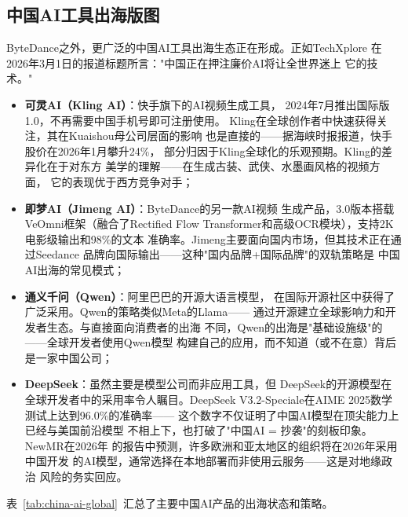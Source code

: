 \subsection{中国AI工具出海版图}
\label{subsec:outlook-china-tools-global}

ByteDance之外，更广泛的中国AI工具出海生态正在形成。正如TechXplore
在2026年3月1日的报道标题所言："中国正在押注廉价AI将让全世界迷上
它的技术。"

\begin{itemize}
  \item \textbf{可灵AI（Kling AI）}：快手旗下的AI视频生成工具，
    2024年7月推出国际版1.0，不再需要中国手机号即可注册使用。
    Kling在全球创作者中快速获得关注，其在Kuaishou母公司层面的影响
    也是直接的——据海峡时报报道，快手股价在2026年1月攀升24\%，
    部分归因于Kling全球化的乐观预期。Kling的差异化在于对东方
    美学的理解——在生成古装、武侠、水墨画风格的视频方面，
    它的表现优于西方竞争对手；

  \item \textbf{即梦AI（Jimeng AI）}：ByteDance的另一款AI视频
    生成产品，3.0版本搭载VeOmni框架（融合了Rectified Flow
    Transformer和高级OCR模块），支持2K电影级输出和98\%的文本
    准确率。Jimeng主要面向国内市场，但其技术正在通过Seedance
    品牌向国际输出——这种"国内品牌+国际品牌"的双轨策略是
    中国AI出海的常见模式；

  \item \textbf{通义千问（Qwen）}：阿里巴巴的开源大语言模型，
    在国际开源社区中获得了广泛采用。Qwen的策略类似Meta的Llama——
    通过开源建立全球影响力和开发者生态。与直接面向消费者的出海
    不同，Qwen的出海是"基础设施级"的——全球开发者使用Qwen模型
    构建自己的应用，而不知道（或不在意）背后是一家中国公司；

  \item \textbf{DeepSeek}：虽然主要是模型公司而非应用工具，但
    DeepSeek的开源模型在全球开发者中的采用率令人瞩目。DeepSeek
    V3.2-Speciale在AIME 2025数学测试上达到96.0\%的准确率——
    这个数字不仅证明了中国AI模型在顶尖能力上已经与美国前沿模型
    不相上下，也打破了"中国AI = 抄袭"的刻板印象。NewMR在2026年
    的报告中预测，许多欧洲和亚太地区的组织将在2026年采用中国开发
    的AI模型，通常选择在本地部署而非使用云服务——这是对地缘政治
    风险的务实回应。
\end{itemize}

表~\ref{tab:china-ai-global}~汇总了主要中国AI产品的出海状态和策略。

